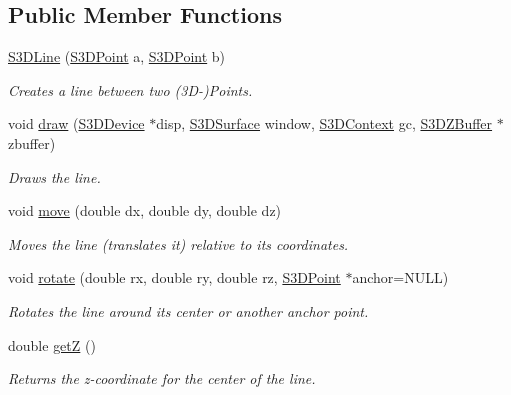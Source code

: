 \subsection*{Public Member Functions}
\begin{DoxyCompactItemize}
\item 
\hyperlink{class_s3_d_line_ae6eeda40b82f27193b1d1165a8fb3e63}{S3DLine} (\hyperlink{class_s3_d_point}{S3DPoint} a, \hyperlink{class_s3_d_point}{S3DPoint} b)
\begin{DoxyCompactList}\small\item\em Creates a line between two (3D-\/)Points. \item\end{DoxyCompactList}\item 
void \hyperlink{class_s3_d_line_aa7732c2d83fecb5d9934863d0e7875c1}{draw} (\hyperlink{types_8h_a25c0773a29204332721bde1b164d0b84}{S3DDevice} $\ast$disp, \hyperlink{types_8h_a4afc89c514af26434688c7e8b382ba5e}{S3DSurface} window, \hyperlink{types_8h_a46f30693e0040340e595d8228cc31779}{S3DContext} gc, \hyperlink{class_s3_d_z_buffer}{S3DZBuffer} $\ast$zbuffer)
\begin{DoxyCompactList}\small\item\em Draws the line. \item\end{DoxyCompactList}\item 
void \hyperlink{class_s3_d_line_a38203e499c32f14ff5da3b7c17861881}{move} (double dx, double dy, double dz)
\begin{DoxyCompactList}\small\item\em Moves the line (translates it) relative to its coordinates. \item\end{DoxyCompactList}\item 
void \hyperlink{class_s3_d_line_a4d23495df2c8f45855d8b80d30b01d30}{rotate} (double rx, double ry, double rz, \hyperlink{class_s3_d_point}{S3DPoint} $\ast$anchor=NULL)
\begin{DoxyCompactList}\small\item\em Rotates the line around its center or another anchor point. \item\end{DoxyCompactList}\item 
double \hyperlink{class_s3_d_line_a72aabdbb4d3d0c3ea36f5fda7b059f6a}{getZ} ()
\begin{DoxyCompactList}\small\item\em Returns the z-\/coordinate for the center of the line. \item\end{DoxyCompactList}\item 

\end{DoxyCompactItemize}
